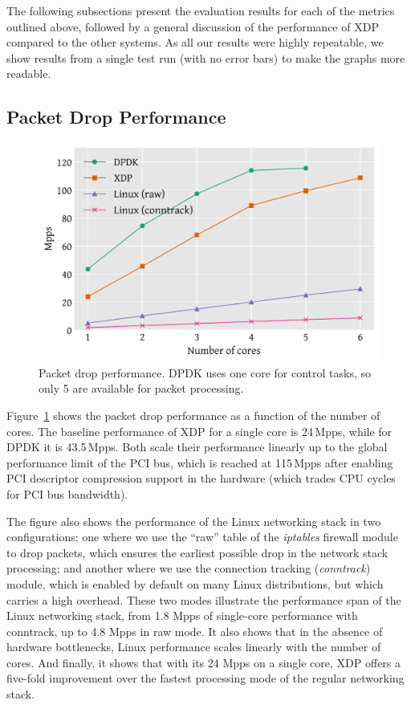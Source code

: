 \documentclass[sigconf]{acmart}
\begin{document}
The following subsections present the evaluation results for each of the metrics
outlined above, followed by a general discussion of the performance of XDP
compared to the other systems. As all our results were highly repeatable, we
show results from a single test run (with no error bars) to make the graphs more
readable.

\subsection{Packet Drop Performance}
\label{sec:basel-pack-proc}

\begin{figure}[t]
\centering
\includegraphics[width=\linewidth]{figures/drop-test.pdf}
\caption{\label{fig:drop-test} Packet drop performance. DPDK uses one core for
  control tasks, so only 5 are available for packet processing.}
\end{figure}

Figure~\ref{fig:drop-test} shows the packet drop performance as a function of
the number of cores. The baseline performance of XDP for a single core is
24\,Mpps, while for DPDK it is 43.5\,Mpps. Both scale their performance linearly
up to the global performance limit of the PCI bus, which is reached at 115\,Mpps
after enabling PCI descriptor compression support in the hardware (which trades
CPU cycles for PCI bus bandwidth).


The figure also shows the performance of the Linux networking stack in two
configurations: one where we use the ``raw'' table of the \emph{iptables}
firewall module to drop packets, which ensures the earliest possible drop in the
network stack processing; and another where we use the connection tracking
(\emph{conntrack}) module, which is enabled by default on many Linux
distributions, but which carries a high overhead. These two modes illustrate the
performance span of the Linux networking stack, from 1.8 Mpps of single-core
performance with conntrack, up to 4.8 Mpps in raw mode. It also shows that in
the absence of hardware bottlenecks, Linux performance scales linearly with the
number of cores. And finally, it shows that with its 24 Mpps on a single core,
XDP offers a five-fold improvement over the fastest processing mode of the
regular networking stack.
\end{document}
